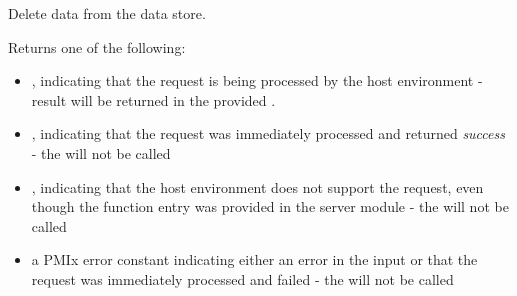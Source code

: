 Delete data from the data store.

\format


\begin{arglist}
\end{arglist}

Returns one of the following:

\begin{itemize}
    \item {}, indicating that the request is being processed by the host environment - result will be returned in the provided .
    \item {}, indicating that the request was immediately processed and returned \textit{success} - the  will not be called
    \item {}, indicating that the host environment does not support the request, even though the function entry was provided in the server module - the  will not be called
    \item a PMIx error constant indicating either an error in the input or that the request was immediately processed and failed - the  will not be called
\end{itemize}

